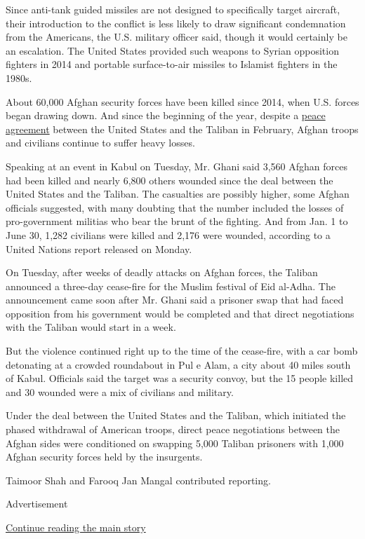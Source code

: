 Since anti-tank guided missiles are not designed to specifically target
aircraft, their introduction to the conflict is less likely to draw
significant condemnation from the Americans, the U.S. military officer
said, though it would certainly be an escalation. The United States
provided such weapons to Syrian opposition fighters in 2014 and portable
surface-to-air missiles to Islamist fighters in the 1980s.

About 60,000 Afghan security forces have been killed since 2014, when
U.S. forces began drawing down. And since the beginning of the year,
despite a
\href{https://www.nytimes.com/2020/02/29/world/asia/us-taliban-deal.html}{peace
agreement} between the United States and the Taliban in February, Afghan
troops and civilians continue to suffer heavy losses.

Speaking at an event in Kabul on Tuesday, Mr. Ghani said 3,560 Afghan
forces had been killed and nearly 6,800 others wounded since the deal
between the United States and the Taliban. The casualties are possibly
higher, some Afghan officials suggested, with many doubting that the
number included the losses of pro-government militias who bear the brunt
of the fighting. And from Jan. 1 to June 30, 1,282 civilians were killed
and 2,176 were wounded, according to a United Nations report released on
Monday.

On Tuesday, after weeks of deadly attacks on Afghan forces, the Taliban
announced a three-day cease-fire for the Muslim festival of Eid al-Adha.
The announcement came soon after Mr. Ghani said a prisoner swap that had
faced opposition from his government would be completed and that direct
negotiations with the Taliban would start in a week.

But the violence continued right up to the time of the cease-fire, with
a car bomb detonating at a crowded roundabout in Pul e Alam, a city
about 40 miles south of Kabul. Officials said the target was a security
convoy, but the 15 people killed and 30 wounded were a mix of civilians
and military.

Under the deal between the United States and the Taliban, which
initiated the phased withdrawal of American troops, direct peace
negotiations between the Afghan sides were conditioned on swapping 5,000
Taliban prisoners with 1,000 Afghan security forces held by the
insurgents.

Taimoor Shah and Farooq Jan Mangal contributed reporting.

Advertisement

\protect\hyperlink{after-bottom}{Continue reading the main story}

